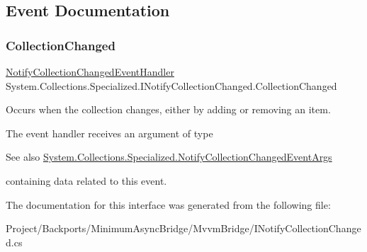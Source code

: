 \subsection{Event Documentation}
\mbox{\label{interface_system_1_1_collections_1_1_specialized_1_1_i_notify_collection_changed_aaabac28f3fd0eb9be7ffbf9ad93ea2bc}} 
\subsubsection{\texorpdfstring{Collection\+Changed}{CollectionChanged}}
{\footnotesize\ttfamily \hyperlink{namespace_system_1_1_collections_1_1_specialized_af0fd13c7ac27802127a046f55bf0b789}{Notify\+Collection\+Changed\+Event\+Handler} System.\+Collections.\+Specialized.\+I\+Notify\+Collection\+Changed.\+Collection\+Changed}



Occurs when the collection changes, either by adding or removing an item. 

The event handler receives an argument of type \begin{DoxySeeAlso}{See also}
\hyperlink{class_system_1_1_collections_1_1_specialized_1_1_notify_collection_changed_event_args}{System.\+Collections.\+Specialized.\+Notify\+Collection\+Changed\+Event\+Args}


\end{DoxySeeAlso}
containing data related to this event. 

The documentation for this interface was generated from the following file\+:\begin{DoxyCompactItemize}
\item 
Project/\+Backports/\+Minimum\+Async\+Bridge/\+Mvvm\+Bridge/I\+Notify\+Collection\+Changed.\+cs\end{DoxyCompactItemize}
